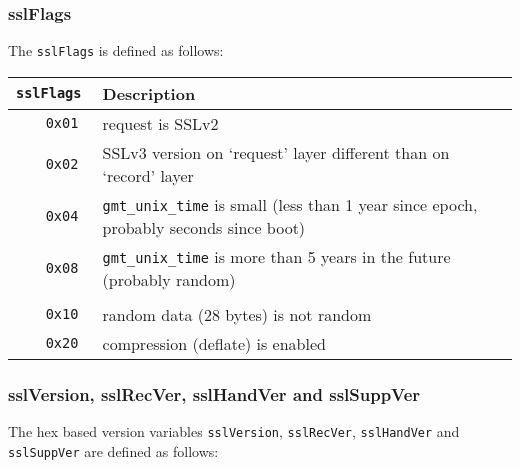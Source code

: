 \documentclass[documentation]{subfiles}
\begin{document}
\subsubsection{sslFlags}\label{sslFlags}
The {\tt sslFlags} is defined as follows:
\begin{longtable}{>{\tt}rl}
    \toprule
    {\bf sslFlags} & {\bf Description}\\
    \midrule\endhead%
    0x01 & request is SSLv2\\
    0x02 & SSLv3 version on `request' layer different than on `record' layer\\
    0x04 & {\tt gmt\_unix\_time} is small (less than 1 year since epoch, probably seconds since boot)\\
    0x08 & {\tt gmt\_unix\_time} is more than 5 years in the future (probably random)\\
    \\
    0x10 & random data (28 bytes) is not random\\
    0x20 & compression (deflate) is enabled\\
    \bottomrule
\end{longtable}

\subsubsection{sslVersion, sslRecVer, sslHandVer and sslSuppVer}\label{sslVersion}
The hex based version variables {\tt sslVersion}, {\tt sslRecVer}, {\tt sslHandVer} and {\tt sslSuppVer} are defined as follows:
\end{document}
